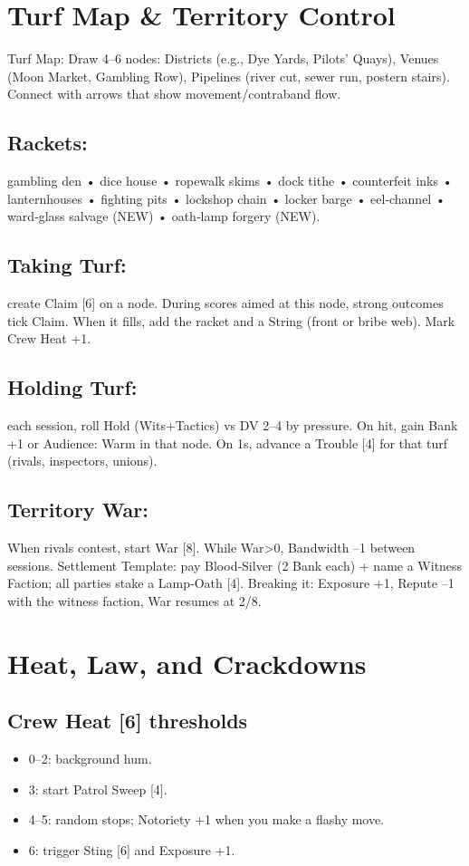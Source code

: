 \documentclass[11pt]{article}
\begin{document}
\section{Turf Map \& Territory Control}
Turf Map: Draw 4--6 nodes: Districts (e.g., Dye Yards, Pilots' Quays), Venues (Moon Market, Gambling Row), Pipelines (river cut, sewer run, postern stairs). Connect with arrows that show movement/contraband flow.

\subsection*{Rackets:} gambling den • dice house • ropewalk skims • dock tithe • counterfeit inks • lanternhouses • fighting pits • lockshop chain • locker barge • eel‑channel • ward‑glass salvage (NEW) • oath‑lamp forgery (NEW).

\subsection*{Taking Turf:} create Claim [6] on a node. During scores aimed at this node, strong outcomes tick Claim. When it fills, add the racket and a String (front or bribe web). Mark Crew Heat +1.

\subsection*{Holding Turf:} each session, roll Hold (Wits+Tactics) vs DV 2--4 by pressure. On hit, gain Bank +1 or Audience: Warm in that node. On 1s, advance a Trouble [4] for that turf (rivals, inspectors, unions).

\subsection*{Territory War:} When rivals contest, start War [8]. While War>0, Bandwidth --1 between sessions. Settlement Template: pay Blood‑Silver (2 Bank each) + name a Witness Faction; all parties stake a Lamp‑Oath [4]. Breaking it: Exposure +1, Repute --1 with the witness faction, War resumes at 2/8.

\section{Heat, Law, and Crackdowns}
\subsection*{Crew Heat [6] thresholds}
\begin{itemize}
\item 0--2: background hum.
\item 3: start Patrol Sweep [4].
\item 4--5: random stops; Notoriety +1 when you make a flashy move.
\item 6: trigger Sting [6] and Exposure +1.
\end{itemize}
\end{document}
